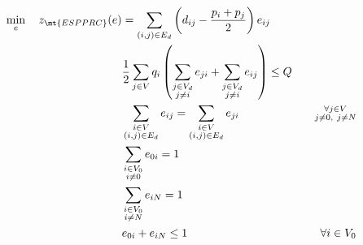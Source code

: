 \begin{align}
	\min_{e} \quad z_\mt{ESPPRC}(e) & =  \sum_{(i, j) \in E_d} \left( d_{ij} - \frac{p_i + p_j}{2} \right) e_{ij} \label{eq:espprc-obj-function}                                                                                 \\
	                                & \frac{1}{2}\sum_{j \in V} q_i \left( \sum_{\substack{j \in V_d                                                                                                                             \\ j \ne i}} e_{ji} + \sum_{\substack{j \in V_d \\ j \ne i}}  e_{ij} \right)   \le Q                                                                             & \label{eq:espprc-resource-upper-bound-constraint}                             \\
	                                & \sum_{\substack{i \in V                                                                                                                                                                    \\ (i, j) \in E_d}}       e_{ij}  = \sum_{\substack{i \in V \\ (i, j) \in E_d}} e_{ji}                                                       & \quad \substack{\forall j \in V                                             \\ j \ne 0,\ j \ne N}         \label{eq:espprc-flow-conservation-constraint-customers} \\
	                                & \sum_{\substack{i \in V_0                                                                                                                                                                  \\ i \ne 0}} e_{0i} = 1 & \label{eq:espprc-flow-conservation-constraint-depot1} \\
	                                & \sum_{\substack{i \in V_0                                                                                                                                                                  \\ i \ne N}} e_{iN} = 1 & \label{eq:espprc-flow-conservation-constraint-depot2} \\
	                                & e_{0i} + e_{iN} \le 1                                                                                      & \quad \forall i \in V_0 \label{eq:espprc-cptp-binding}                        \\

\end{align}
